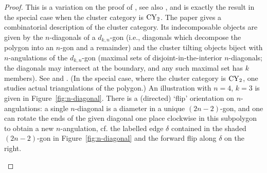 \documentclass[10pt,a4paper]{amsart}
\theoremstyle{definition}
\numberwithin{equation}{section}
\begin{document}
 \begin{proof}
 This is a variation on the proof of \cite[Theorem 9.9]{BS}, see also \cite[Theorem~7.15]{Ikeda}, and is exactly the result \cite[Theorem~4.7]{Brustle-YuQiu} in the special case when the cluster category is ${\rm CY}_2$. The paper \cite{Baur-Marsh} gives a combinatorial description of the cluster category. Its indecomposable objects are given by the $n$-diagonals of a $d_{k,n}$-gon (i.e., diagonals which decompose the polygon into an $n$-gon and a remainder) and the cluster tilting objects biject with $n$-angulations of the $d_{k,n}$-gon (maximal sets of disjoint-in-the-interior $n$-diagonals; the diagonals may intersect at the boundary, and any such maximal set has $k$ members). See \cite[Proposition~5.4]{Baur-Marsh} and \cite[Theorem~4.2]{Jacquet-Malo}. (In the special case, where the cluster category is ${\rm CY}_2$, one studies actual triangulations of the polygon.) An illustration with $n=4$, $k=3$ is given in Figure~\ref{fig:n-diagonal}. There is a (directed) `flip' orientation on $n$-angulations: a single $n$-diagonal is a diameter in a unique $(2n-2)$-gon, and one can rotate the ends of the given diagonal one place clockwise in this subpolygon to obtain a new $n$-angulation, cf. the labelled edge $\delta$ contained in the shaded $(2n-2)$-gon in Figure~\ref{fig:n-diagonal} and the forward flip along $\delta$ on the right.

\begin{figure}[ht]\centering

\end{figure}
\end{proof}
\end{document}
